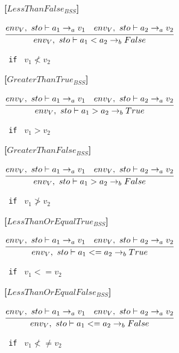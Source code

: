 \textbf{[$LessThanFalse_{BSS}$]}\\
\begin{center}
	\begin{math}
	\cfrac
	{env_V,\ sto \vdash a_1 \rightarrow_a v_1 \quad env_V,\ sto \vdash a_2 \rightarrow_a v_2}
	{env_V,\ sto \vdash a_1 < a_2 \rightarrow_b False}
	\end{math}
	
	\texttt{ if } $v_1 \not< v_2$
\end{center}

\textbf{[$GreaterThanTrue_{BSS}$]}\\
\begin{center}
	\begin{math}
	\cfrac
	{env_V,\ sto \vdash a_1 \rightarrow_a v_1 \quad env_V,\ sto \vdash a_2 \rightarrow_a v_2}
	{env_V,\ sto \vdash a_1 > a_2 \rightarrow_b True}
	\end{math}
	
	\texttt{ if } $v_1 > v_2$
\end{center}

\textbf{[$GreaterThanFalse_{BSS}$]}\\
\begin{center}
	\begin{math}
	\cfrac
	{env_V,\ sto \vdash a_1 \rightarrow_a v_1 \quad env_V,\ sto \vdash a_2 \rightarrow_a v_2}
	{env_V,\ sto \vdash a_1 > a_2 \rightarrow_b False}
	\end{math}
	
	\texttt{ if } $v_1 \not> v_2$
\end{center}

\textbf{[$LessThanOrEqualTrue_{BSS}$]}\\
\begin{center}
	\begin{math}
	\cfrac
	{env_V,\ sto \vdash a_1 \rightarrow_a v_1 \quad env_V,\ sto \vdash a_2 \rightarrow_a v_2}
	{env_V,\ sto \vdash a_1 <= a_2 \rightarrow_b True}
	\end{math}
	
	\texttt{ if } $v_1 <= v_2$
\end{center}

\textbf{[$LessThanOrEqualFalse_{BSS}$]}\\
\begin{center}
	\begin{math}
	\cfrac
	{env_V,\ sto \vdash a_1 \rightarrow_a v_1 \quad env_V,\ sto \vdash a_2 \rightarrow_a v_2}
	{env_V,\ sto \vdash a_1 <= a_2 \rightarrow_b False}
	\end{math}
	
	\texttt{ if } $v_1 \not<\not= v_2$
\end{center}

